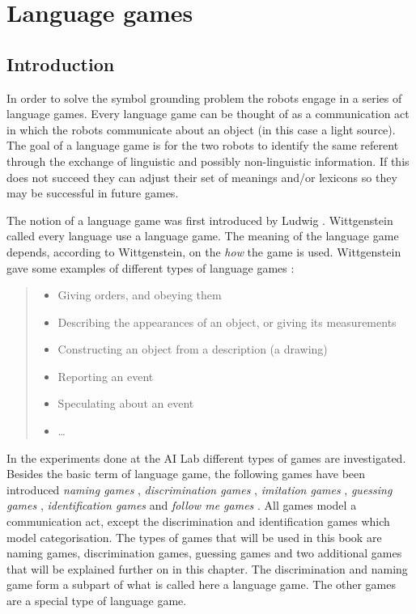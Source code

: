 \chapter{Language games}\label{ch:lg}\label{ch:cm}

\section{Introduction}

In order to solve the symbol grounding problem the robots engage in a series of language games. Every language game can be thought of as a communication act in which the robots communicate about an object (in this case a light source). The goal of a language game is for the two robots to identify the same referent through the exchange of linguistic and possibly non-linguistic information. If this does not succeed they can adjust their set of meanings and/or lexicons so they may be successful in future games.


The notion of a language game was first introduced by Ludwig \citet{wittgenstein:1958}. Wittgenstein called every language use a language game. The meaning of the language game depends, according to Wittgenstein, on the {\em how} the game is used. Wittgenstein gave some examples of different types of language games \cite[11, §22]{wittgenstein:1958}:

\begin{quote}
\begin{itemize}
\item Giving orders, and obeying them
\item Describing the appearances of an object, or giving its measurements
\item Constructing an object from a description (a drawing)
\item Reporting an event
\item Speculating about an event
\item \ldots 
\end{itemize}
\end{quote}

In the experiments done at the AI Lab different types of games are investigated. Besides the basic term of language game, the following games have been introduced {\em naming games} \citep{steels:1996a}, {\em discrimination games} \citep{steels:1996b}, {\em imitation games} \citep{deboer:1997}, {\em guessing games} \citep{steelskaplan:1999}, {\em identification games} and {\em follow me games} \citep{vogt:1999a,vogt:2000}. All games model a communication act, except the discrimination and identification games which model categorisation. The types of games that will be used in this book are naming games, discrimination games, guessing games and two additional games that will be explained further on in this chapter. The discrimination and naming game form a subpart of what is called here a language game. The other games are a special type of language game.

